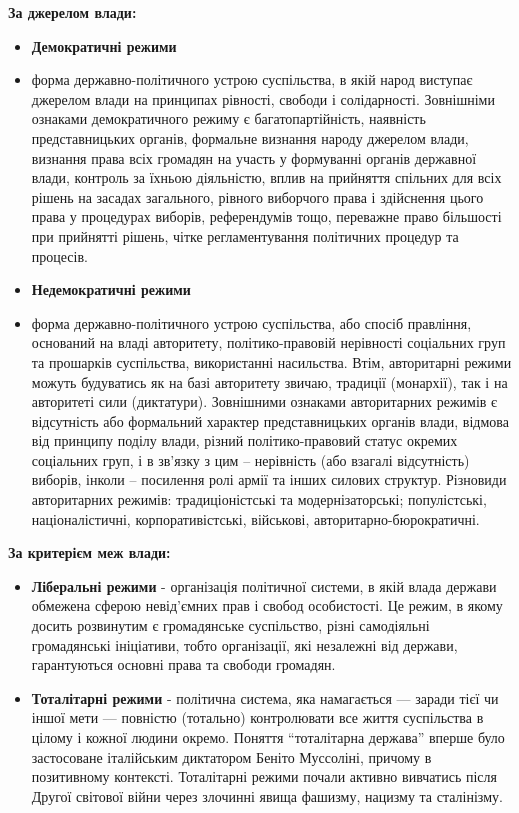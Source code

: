 \noindent\textbf{За джерелом влади:}
\begin{itemize}
\item\textbf{Демократичні режими} \item форма державно-політичного устрою суспільства, в якій народ виступає джерелом влади на принципах рівності, свободи і солідарності. Зовнішніми ознаками демократичного режиму є багатопартійність, наявність представницьких органів, формальне визнання народу джерелом влади, визнання права всіх громадян на участь у формуванні органів державної влади, контроль за їхньою діяльністю, вплив на прийняття спільних для всіх рішень на засадах загального, рівного виборчого права і здійснення цього права у процедурах виборів, референдумів тощо, переважне право більшості при прийнятті рішень, чітке регламентування політичних процедур та процесів.
\item\textbf{Недемократичні режими} \item форма державно-політичного устрою суспільства, або спосіб правління, оснований на владі авторитету, політико-правовій нерівності соціальних груп та прошарків суспільства, використанні насильства. Втім, авторитарні режими можуть будуватись як на базі авторитету звичаю, традиції (монархії), так і на авторитеті сили (диктатури). Зовнішними ознаками авторитарних режимів є відсутність або формальний характер представницьких органів влади, відмова від принципу поділу влади, різний політико-правовий статус окремих соціальних груп, і в зв’язку з цим – нерівність (або взагалі відсутність) виборів, інколи – посилення ролі армії та інших силових структур. Різновиди авторитарних режимів: традиціоністські та модернізаторські; популістські, націоналістичні, корпоративістські, військові, авторитарно-бюрократичні.

\end{itemize}
\noindent\textbf{За критерієм меж влади:}
\begin{itemize}
\item \textbf{Ліберальні режими} - організація політичної системи, в якій влада держави обмежена сферою невід’ємних прав і свобод особистості. Це режим, в якому досить розвинутим є громадянське суспільство, різні самодіяльні громадянські ініціативи, тобто організації, які незалежні від держави, гарантуються основні права та свободи громадян.
\item \textbf{Тоталітарні режими} - політична система, яка намагається — заради тієї чи іншої мети — повністю (тотально) контролювати все життя суспільства в цілому і кожної людини окремо. Поняття “тоталітарна держава” вперше було застосоване італійським диктатором Беніто Муссоліні, причому в позитивному контексті. Тоталітарні режими почали активно вивчатись після Другої світової війни через злочинні явища фашизму, нацизму та сталінізму.
\end{itemize}


